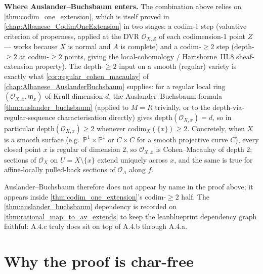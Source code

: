 \begin{remark}
  \label{rmk:thm32_role_of_ab}
  \textbf{Where Auslander--Buchsbaum enters.} The combination above relies on
  \cref{thm:codim_one_extension}, which is itself proved in
  \cref{chap:Albanese_CodimOneExtension} in two stages: a codim-\(1\) step
  (valuative criterion of properness, applied at the DVR
  \(\mathcal O_{X, Z}\) of each codimension-\(1\) point \(Z\) --- works because \(X\) is normal
  and \(A\) is complete) and a codim-\(\geq 2\) step (depth-\(\geq 2\) at codim-\(\geq 2\) points,
  giving the local-cohomology / Hartshorne~III.8 sheaf-extension property). The
  depth-\(\geq 2\) input on a smooth (regular) variety is exactly what
  \cref{cor:regular_cohen_macaulay} of \cref{chap:Albanese_AuslanderBuchsbaum} supplies:
  for a regular local ring \((\mathcal O_{X, x}, \mathfrak m_x)\) of Krull dimension \(d\), the
  Auslander--Buchsbaum formula \cref{thm:auslander_buchsbaum} (applied to \(M = R\)
  trivially, or to the depth-via-regular-sequence characterisation directly) gives
  \(\mathrm{depth}(\mathcal O_{X, x}) = d\), so in particular
  \(\mathrm{depth}(\mathcal O_{X, x}) \geq 2\) whenever \(\mathrm{codim}_X(\{x\}) \geq 2\).
  Concretely, when \(X\) is a smooth surface (e.g.\ \(\mathbb P^1 \times \mathbb P^1\) or
  \(C \times C\) for a smooth projective curve \(C\)), every closed point \(x\) is regular of
  dimension \(2\), so \(\mathcal O_{X, x}\) is Cohen--Macaulay of depth \(2\); sections of
  \(\mathcal O_X\) on \(U = X \setminus \{x\}\) extend uniquely across \(x\), and the same is
  true for affine-locally pulled-back sections of \(\mathcal O_A\) along \(f\).

  Auslander--Buchsbaum therefore does not appear by name in the proof above; it appears
  inside \cref{thm:codim_one_extension}'s codim-\(\geq 2\) half. The
  \cref{thm:auslander_buchsbaum} dependency is recorded on
  \cref{thm:rational_map_to_av_extends} to keep the leanblueprint dependency graph
  faithful: A.4.c truly does sit on top of A.4.b through A.4.a.
\end{remark}

\section{Why the proof is char-free}
\label{sec:thm32_char_free}

